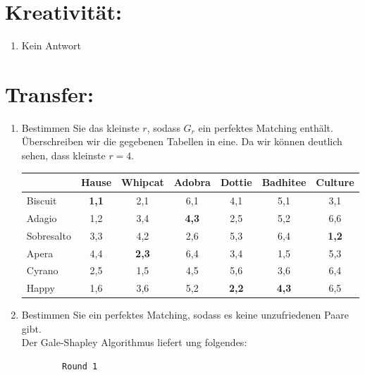     \section*{Kreativität:}
    \begin{enumerate}[label=(\alph*)]
    	\item Kein Antwort
    \end{enumerate}
    
    \section*{Transfer:}
    \begin{enumerate}[label=(\alph*)]
    	\item Bestimmen Sie das kleinste $r$, sodass $G_r$ ein perfektes Matching enthält.\\
        Überschreiben wir die gegebenen Tabellen in eine. Da wir können deutlich sehen, dass kleinste $r=4$.
        \begin{table}[h]\centering
            \begin{tabular}{|l|c|c|c|c|c|c|}
            \hline
            ~          & Hause     & Whipcat   & Adobra    & Dottie    & Badhitee  & Culture   \\ \hline
            Biscuit    & {\bf 1,1} & 2,1       & 6,1       & 4,1       & 5,1       & 3,1       \\ \hline
            Adagio     & 1,2       & 3,4       & {\bf 4,3} & 2,5       & 5,2       & 6,6       \\ \hline
            Sobresalto & 3,3       & 4,2       & 2,6       & 5,3       & 6,4       & {\bf 1,2} \\ \hline
            Apera      & 4,4       & {\bf 2,3} & 6,4       & 3,4       & 1,5       & 5,3       \\ \hline
            Cyrano     & 2,5       & 1,5       & 4,5       & 5,6       & 3,6       & 6,4       \\ \hline
            Happy      & 1,6       & 3,6       & 5,2       & {\bf 2,2} & {\bf 4,3} & 6,5       \\ \hline
            \end{tabular}
        \end{table}
        
        \item Bestimmen Sie ein perfektes Matching, sodass es keine unzufriedenen Paare gibt.\\
        Der Gale-Shapley Algorithmus liefert ung folgendes: \par
   \begin{lstlisting}
        Round 1
        

\end{lstlisting}
\end{enumerate}
